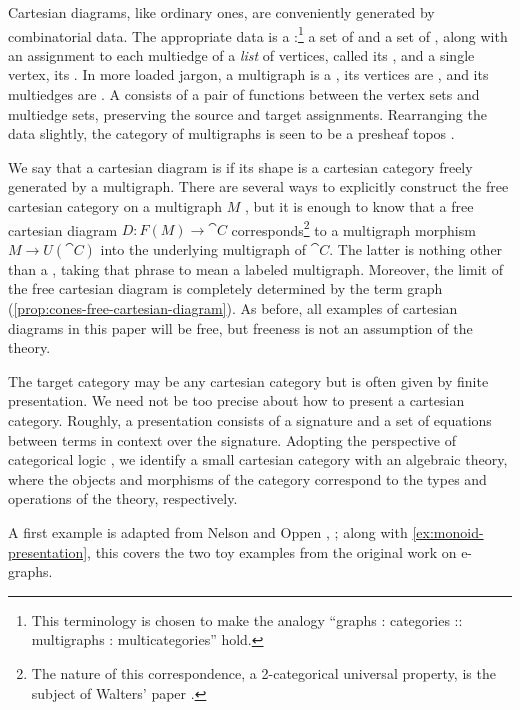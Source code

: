 \documentclass[11pt]{article}
\numberwithin{equation}{section}
\begin{document}
Cartesian diagrams, like ordinary ones, are conveniently generated by
combinatorial data. The appropriate data is a :\footnote{This
  terminology is chosen to make the analogy ``graphs : categories :: multigraphs :
  multicategories'' hold.} a set of  and a set of
, along with an assignment to each multiedge of a \emph{list} of
vertices, called its , and a single vertex, its .
In more loaded jargon, a multigraph is a , its vertices are
, and its multiedges are . A
 consists of a pair of functions between the
vertex sets and multiedge sets, preserving the source and target assignments.
Rearranging the data slightly, the category of multigraphs is seen to be a
presheaf topos \cite[\S{1}]{walters1989}.

We say that a cartesian diagram is  if its shape is a cartesian
category freely generated by a multigraph. There are several ways to explicitly
construct the free cartesian category on a multigraph $M$
\cite[e.g.,][\S{2}]{walters1989}, but it is enough to know that a free cartesian
diagram $D: F(M) \to \cat{C}$ corresponds\footnote{The nature of this
  correspondence, a 2-categorical universal property, is the subject of Walters'
  paper \cite{walters1989}.} to a multigraph morphism $M \to U(\cat{C})$ into the
underlying multigraph of $\cat{C}$. The latter is nothing other than a
, taking that phrase to mean a labeled multigraph. Moreover,
the limit of the free cartesian diagram is completely determined by the term
graph (\cref{prop:cones-free-cartesian-diagram}). As before, all examples of
cartesian diagrams in this paper will be free, but freeness is not an assumption
of the theory.

The target category may be any cartesian category but is often given by finite
presentation. We need not be too precise about how to present a cartesian
category. Roughly, a presentation consists of a signature and a set of equations
between terms in context over the signature. Adopting the perspective of
categorical logic \cite{lawvere1963,crole1993,adamek2011}, we identify a small
cartesian category with an algebraic theory, where the objects and morphisms of
the category correspond to the types and operations of the theory, respectively.

A first example is adapted from Nelson and Oppen \cite[\S{6}]{nelson1980},
\cite{nelson-oppen1980}; along with \cref{ex:monoid-presentation}, this covers
the two toy examples from the original work on e-graphs.
\end{document}
